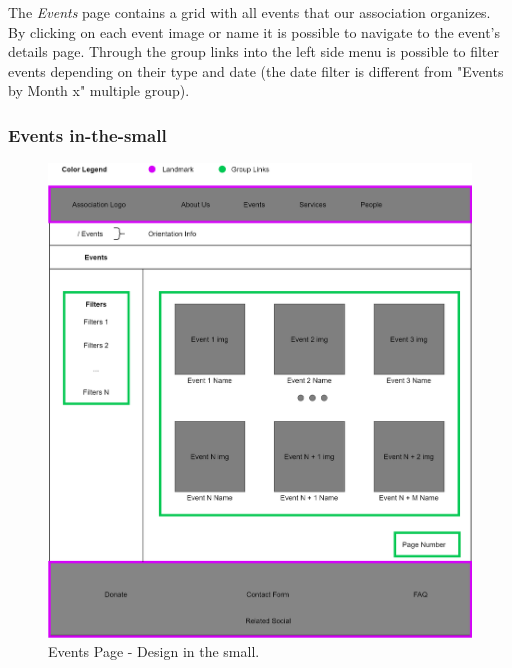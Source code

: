 The \emph{Events} page contains a grid with all events that our association organizes.  By clicking on each event image or name it is possible to navigate to the event's details page. Through the group links into the left side menu is possible to filter events depending on their type and date (the date filter is different from "Events by Month x" multiple group).

\subsubsection{Events in-the-small}
\begin{figure}[h!]
		\centering
		\begin{minipage}[b]{1\textwidth}
    			\includegraphics[width=\textwidth]{./assets/events.png}
			\caption{Events Page - Design in the small.}
		\end{minipage}
	\end{figure}
\FloatBarrier 

\clearpage

